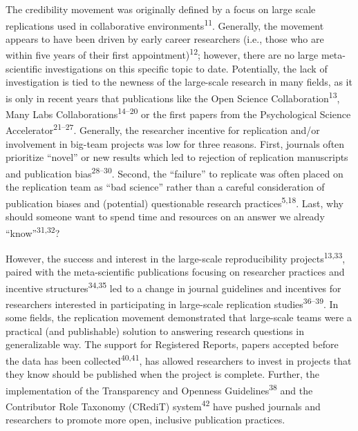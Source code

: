 \documentclass[
  man,floatsintext]{apa6}
\begin{document}
The credibility movement was originally defined by a focus on large
scale replications used in collaborative environments\textsuperscript{11}.
Generally, the movement appears to have been driven by early career
researchers (i.e., those who are within five years of their first
appointment)\textsuperscript{12}; however, there are no large meta-scientific
investigations on this specific topic to date. Potentially, the lack of
investigation is tied to the newness of the large-scale research in many
fields, as it is only in recent years that publications like the Open
Science Collaboration\textsuperscript{13}, Many Labs
Collaborations\textsuperscript{14--20} or the first papers from the
Psychological Science Accelerator\textsuperscript{21--27}. Generally, the researcher incentive for
replication and/or involvement in big-team projects was low for three reasons. First, journals often prioritize
``novel'' or new results which led to rejection of replication manuscripts
and publication bias\textsuperscript{28--30}. Second,
the ``failure'' to replicate was often placed on the replication team as
``bad science'' rather than a careful consideration of publication biases
and (potential) questionable research practices\textsuperscript{5,18}. Last, why should someone want to spend time and resources
on an answer we already ``know''\textsuperscript{31,32}?

However, the success and interest in the large-scale reproducibility
projects\textsuperscript{13,33}, paired
with the meta-scientific publications focusing on researcher practices
and incentive structures\textsuperscript{34,35} led to a
change in journal guidelines and incentives for researchers interested
in participating in large-scale replication studies\textsuperscript{36--39}. In some fields, the
replication movement demonstrated that large-scale teams were a
practical (and publishable) solution to answering research questions
in generalizable way. The support
for Registered Reports, papers accepted before the data has been
collected\textsuperscript{40,41}, has allowed researchers to
invest in projects that they know
should be published when the project is complete. Further, the
implementation of the Transparency and Openness Guidelines\textsuperscript{38}
and the Contributor Role Taxonomy (CRediT) system\textsuperscript{42} have
pushed journals and researchers to promote more open, inclusive
publication practices.
\end{document}

